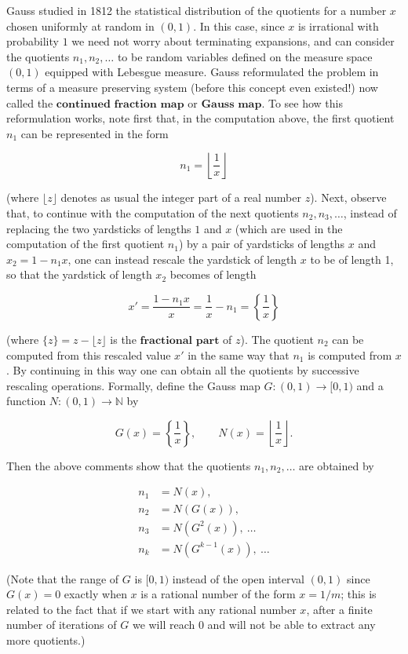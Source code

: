 \documentclass[11pt]{report}
\newcommand{\N}{\mathbb{N}}
\theoremstyle{plain}
\theoremstyle{definition}
\begin{document}
\begin{enumerate}[label=\arabic*.]
Gauss studied in 1812 the statistical distribution of the quotients for a number $x$ chosen uniformly at random in $(0,1)$. In this case, since $x$ is irrational with probability $1$ we need not worry about terminating expansions, and can consider the quotients $n_1, n_2, \ldots$ to be random variables defined on the measure space $(0,1)$ equipped with Lebesgue measure. Gauss reformulated the problem in terms of a measure preserving system (before this concept even existed!) now called the $\textbf{continued fraction map}$ or $\textbf{Gauss map}$. To see how this reformulation works, note first that, in the computation above, the first quotient $n_1$ can be represented in the form

\[
n_1 = \left\lfloor \frac{1}{x} \right\rfloor
\]

(where $\lfloor z \rfloor$ denotes as usual the integer part of a real number $z$). Next, observe that, to continue with the computation of the next quotients $n_2,n_3,\ldots$, instead of replacing the two yardsticks of lengths $1$ and $x$ (which are used in the computation of the first quotient $n_1$) by a pair of yardsticks of lengths $x$ and $x_2=1-n_1 x$, one can instead rescale the yardstick of length $x$ to be of length 1, so that the yardstick of length $x_2$ becomes of length

\[
x'=\frac{1-n_1 x}{x} = \frac{1}{x}-n_1 = \left\{ \frac{1}{x} \right\}
\]

(where $\{z\}=z-\lfloor z\rfloor$ is the $\textbf{fractional part}$ of $z$). The quotient $n_2$ can be computed from this rescaled value $x'$ in the same way that $n_1$ is computed from $x$. By continuing in this way one can obtain all the quotients by successive rescaling operations. Formally, define the Gauss map $G:(0,1)\to[0,1)$ and a function $N:(0,1)\to\N$ by

\[
G(x) = \left\{ \frac{1}{x}\right\}, \qquad
N(x) = \left\lfloor \frac{1}{x}\right\rfloor.
\]

Then the above comments show that the quotients $n_1,n_2,\ldots$ are obtained by

\begin{align*}
n_1 &= N(x), \\
n_2 &= N(G(x)), \\
n_3 &= N(G^2(x)), \ \ldots \\
n_k &= N(G^{k-1}(x)), \ \ldots
\end{align*}

(Note that the range of $G$ is $[0,1)$ instead of the open interval $(0,1)$ since $G(x)=0$ exactly when $x$ is a rational number of the form $x=1/m$; this is related to the fact that if we start with any rational number $x$, after a finite number of iterations of $G$ we will reach $0$ and will not be able to extract any more quotients.)


\end{enumerate}
\end{document}

